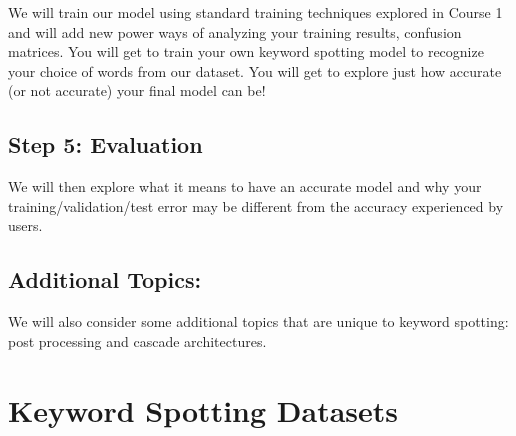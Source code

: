 We will train our model using standard training techniques explored in Course 1 and will add new power ways of analyzing your training results, confusion matrices. You will get to train your own keyword spotting model to recognize your choice of words from our dataset. You will get to explore just how accurate (or not accurate) your final model can be!

\subsection{Step 5: Evaluation}

We will then explore what it means to have an accurate model and why your training/validation/test error may be different from the accuracy experienced by users.

\subsection{Additional Topics:}

We will also consider some additional topics that are unique to keyword spotting: post processing and cascade architectures.

\section{Keyword Spotting Datasets}

